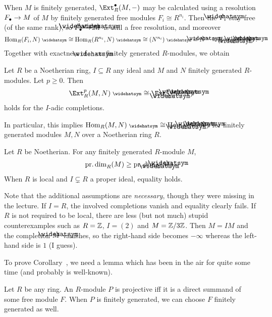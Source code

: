 \documentclass[a4paper,parskip=half,numbers=enddot, DIV=12]{scrreprt}
\begin{document}
When $M$ is finitely generated, $\Ext_R^\bullet(M,-)$ may be calculated using a resolution $F_\bullet \morphism M$ of $M$ by finitely generated free modules $F_i\cong R^{n_i}$. Then the $\roof{F}_i$ stay free (of the same rank), so $\roof{F}_\bullet\morphism \roof{M}$ is still a free resolution, and moreover
\begin{align*}
	\Hom_R(F_i,N)^\complete \cong \Hom_R(R^{n_i},N)^\complete \cong (N^{n_i})^\complete \cong \roof{N}^{n_i}\cong \Hom_{\roof{R}}(\roof{F_i},\roof{N})\;.
\end{align*}
Together with exactness of $\roof{\phantom{x}}$ on finitely generated $R$-modules, we obtain
\begin{prop}
	Let $R$ be a Noetherian ring, $I\subseteq R$ any ideal and $M$ and $N$ finitely generated $R$-modules. Let $p\geq 0$. Then
	\begin{align*}
		\Ext_R^p(M,N)^\complete \cong \Ext_{\roof{R}}^p(\roof{M},\roof{N})
	\end{align*}
	holds for the $I$-adic completions.
\end{prop}
In particular, this implies $\Hom_R(M,N)^\complete \cong\Hom_{\roof{R}}(\roof{M},\roof{N})$ for finitely generated modules $M,N$ over a Noetherian ring $R$.
\begin{cor}
	Let $R$ be Noetherian. For any finitely generated $R$-module $M$, 
	\begin{align*}		
		\pdim_R(M)\geq\pdim_{\roof{R}}(\roof{M})\;.
	\end{align*}
	When $R$ is local and $I\subsetneq R$ a proper ideal, equality holds.
\end{cor}
\begin{rem*}
	Note that the additional assumptions are \emph{necessary}, though they were missing in the lecture. If $I=R$, the involved completions vanish and equality clearly fails. If $R$ is not required to be local, there are less (but not much) stupid counterexamples such as $R=\mathbb{Z}$, $I=(2)$ and $M=\mathbb{Z}/3\mathbb{Z}$. Then $M=IM$ and the completion $\roof{M}$ vanishes, so the right-hand side becomes $-\infty$ whereas the left-hand side is $1$ (I guess).
\end{rem*}
To prove Corollary~, we need a lemma which has been in the air for quite some time (and probably is well-known).
\begin{lem}
	Let $R$ be any ring. An $R$-module $P$ is projective iff it is a direct summand of some free module $F$. When $P$ is finitely generated, we can choose $F$ finitely generated as well.
\end{lem}
\end{document}
